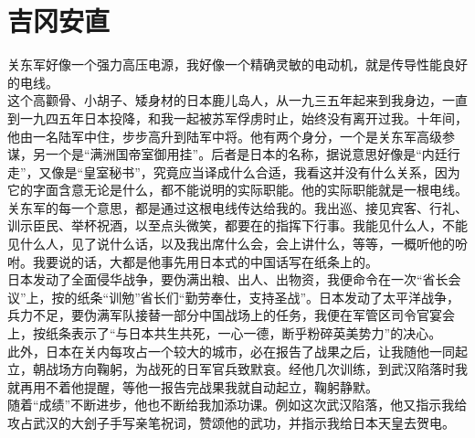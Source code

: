 \fancyhead[RO]{} %
\fancyhead[LE]{} %
\chapter*{吉冈安直}
\thispagestyle{empty}
关东军好像一个强力高压电源，我好像一个精确灵敏的电动机，就是传导性能良好的电线。\\

这个高颧骨、小胡子、矮身材的日本鹿儿岛人，从一九三五年起来到我身边，一直到一九四五年日本投降，和我一起被苏军俘虏时止，始终没有离开过我。十年间，他由一名陆军中住，步步高升到陆军中将。他有两个身分，一个是关东军高级参谋，另一个是“满洲国帝室御用挂”。后者是日本的名称，据说意思好像是“内廷行走”，又像是“皇室秘书”，究竟应当译成什么合适，我看这并没有什么关系，因为它的字面含意无论是什么，都不能说明的实际职能。他的实际职能就是一根电线。关东军的每一个意思，都是通过这根电线传达给我的。我出巡、接见宾客、行礼、训示臣民、举杯祝酒，以至点头微笑，都要在的指挥下行事。我能见什么人，不能见什么人，见了说什么话，以及我出席什么会，会上讲什么，等等，一概听他的吩咐。我要说的话，大都是他事先用日本式的中国话写在纸条上的。\\

日本发动了全面侵华战争，要伪满出粮、出人、出物资，我便命令在一次“省长会议”上，按的纸条“训勉”省长们“勤劳奉仕，支持圣战”。日本发动了太平洋战争，兵力不足，要伪满军队接替一部分中国战场上的任务，我便在军管区司令官宴会上，按纸条表示了“与日本共生共死，一心一德，断乎粉碎英美势力”的决心。\\

此外，日本在关内每攻占一个较大的城市，必在报告了战果之后，让我随他一同起立，朝战场方向鞠躬，为战死的日军官兵致默哀。经他几次训练，到武汉陷落时我就再用不着他提醒，等他一报告完战果我就自动起立，鞠躬静默。\\

随着“成绩”不断进步，他也不断给我加添功课。例如这次武汉陷落，他又指示我给攻占武汉的大刽子手写亲笔祝词，赞颂他的武功，并指示我给日本天皇去贺电。\\

